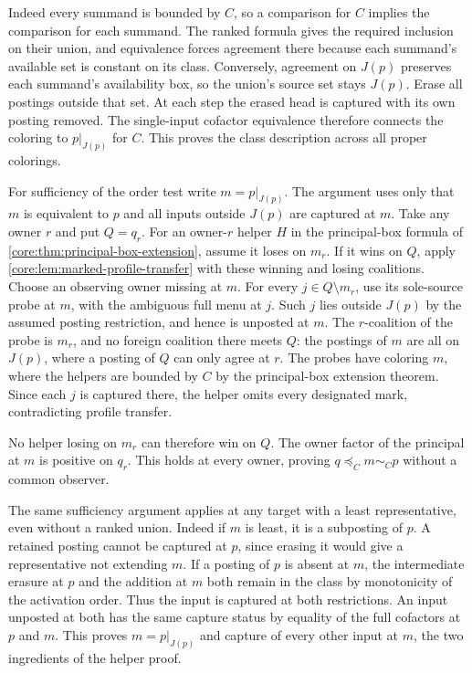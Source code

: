 Indeed every summand is bounded by $C$, so a comparison
for $C$ implies the comparison for each summand. The
ranked formula gives the required inclusion on their
union, and equivalence forces agreement there because
each summand's available set is constant on its class.
Conversely, agreement on $J(p)$ preserves each summand's
availability box, so the union's source set stays $J(p)$.
Erase all postings outside that set. At each step the
erased head is captured with its own posting removed.
The single-input cofactor equivalence therefore connects
the coloring to $p|_{J(p)}$ for $C$. This proves the class
description across all proper colorings.

For sufficiency of the order test write $m=p|_{J(p)}$.
The argument uses only that $m$ is equivalent to $p$
and all inputs outside $J(p)$ are captured at $m$.
Take any owner $r$ and put $Q=q_r$. For an owner-$r$
helper $H$ in the principal-box formula
of \cref{core:thm:principal-box-extension}, assume it
loses on $m_r$. If it wins on $Q$, apply
\cref{core:lem:marked-profile-transfer} with these winning
and losing coalitions. Choose an observing owner missing
at $m$. For every $j\in Q\setminus m_r$, use its
sole-source probe at $m$, with the ambiguous full menu
at $j$. Such $j$ lies outside $J(p)$ by the assumed
posting restriction, and hence is unposted at $m$.
The $r$-coalition of the probe is $m_r$, and no foreign
coalition there meets $Q$: the postings of $m$ are all
on $J(p)$, where a posting of $Q$ can only agree at $r$.
The probes have coloring $m$, where the helpers are
bounded by $C$ by the principal-box extension theorem.
Since each $j$ is captured there, the helper omits every
designated mark, contradicting profile transfer.

No helper losing on $m_r$ can therefore win on $Q$.
The owner factor of the principal at $m$ is positive
on $q_r$. This holds at every owner, proving
$q\preceq_C m\sim_C p$ without a common observer.

The same sufficiency argument applies at any target with
a least representative, even without a ranked union.
Indeed if $m$ is least, it is a subposting of $p$. A retained
posting cannot be captured at $p$, since erasing it would
give a representative not extending $m$. If a posting of
$p$ is absent at $m$, the intermediate erasure at $p$ and
the addition at $m$ both remain in the class by monotonicity
of the activation order. Thus the input is captured at
both restrictions. An input unposted at both has the same
capture status by equality of the full cofactors at $p$
and $m$. This proves $m=p|_{J(p)}$ and capture of every
other input at $m$, the two ingredients of the helper proof.

